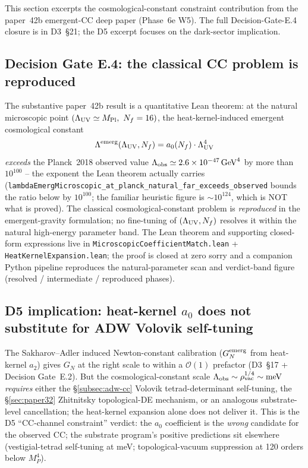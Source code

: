 \documentclass[aps,prd,reprint,nofootinbib,superscriptaddress]{revtex4-2}
\begin{document}
This section excerpts the cosmological-constant constraint contribution
from the paper~42b emergent-CC deep paper (Phase~6e W5). The full
Decision-Gate-E.4 closure is in D3~§21; the D5 excerpt focuses on the
dark-sector implication.

\subsection{Decision Gate E.4: the classical CC problem is reproduced}
\label{subsec:42b-decision-gate-e4}

The substantive paper~42b result is a quantitative Lean theorem: at the
natural microscopic point $(\Lambda_{\rm UV} \simeq M_{\rm Pl},\
N_f = 16)$, the heat-kernel-induced emergent cosmological constant
\begin{equation}
\Lambda^{\rm emerg}(\Lambda_{\rm UV}, N_f)
= a_0(N_f) \cdot \Lambda_{\rm UV}^4
\end{equation}
\emph{exceeds} the Planck~2018 observed value
$\Lambda_{\rm obs} \simeq 2.6 \times 10^{-47}\,\text{GeV}^4$ by more than
$10^{100}$ -- the exponent the Lean theorem actually carries
(\texttt{lambdaEmergMicroscopic\_at\_planck\_natural\_far\_exceeds\_observed}
bounds the ratio below by $10^{100}$; the familiar heuristic figure is
$\sim10^{124}$, which is NOT what is proved). The classical
cosmological-constant problem is
\emph{reproduced} in the emergent-gravity formulation; no fine-tuning
of $(\Lambda_{\rm UV}, N_f)$ resolves it within the natural high-energy
parameter band. The Lean theorem and supporting closed-form expressions
live in \texttt{MicroscopicCoefficientMatch.lean} +
\texttt{HeatKernelExpansion.lean}; the proof is closed at zero sorry
and a companion Python pipeline reproduces the natural-parameter scan
and verdict-band figure (resolved / intermediate / reproduced phases).

\subsection{D5 implication: heat-kernel $a_0$ does not substitute for
ADW Volovik self-tuning}
\label{subsec:42b-d5-implication}

The Sakharov--Adler induced Newton-constant calibration
($G_N^{\rm emerg}$ from heat-kernel $a_2$) gives $G_N$ at the right
scale to within a $\mathcal{O}(1)$ prefactor (D3~§17 + Decision Gate~E.2).
But the cosmological-constant scale
$\Lambda_{\rm obs} \sim \rho_{\rm vac}^{1/4} \sim \SI{}{\milli\electronvolt}$
\emph{requires} either the §\ref{subsec:adw-cc} Volovik
tetrad-determinant self-tuning, the §\ref{sec:paper32} Zhitnitsky
topological-DE mechanism, or an analogous substrate-level cancellation;
the heat-kernel expansion alone does not deliver it. This is the D5
``CC-channel constraint'' verdict: the $a_0$ coefficient is the
\emph{wrong} candidate for the observed CC; the substrate program's
positive predictions sit elsewhere (vestigial-tetrad self-tuning at
meV; topological-vacuum suppression at 120 orders below $M_P^4$).
\end{document}

